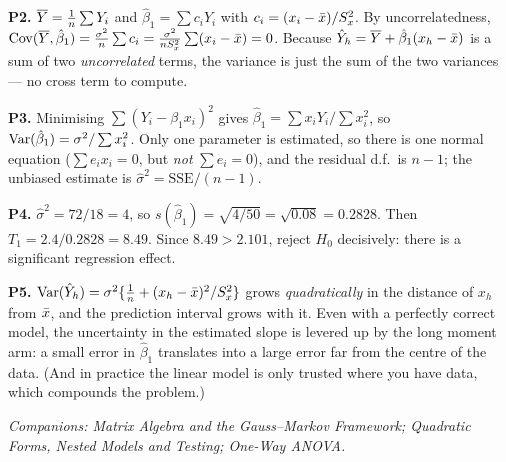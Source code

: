 \documentclass[11pt]{article}
\begin{document}
\smallskip\noindent\textbf{P2.} $\overline{Y}=\frac1n\sum Y_i$ and $\hat\beta_1=\sum c_iY_i$ with
$c_i=(x_i-\bar{x})/S_x^2$. By uncorrelatedness,
$\operatorname{Cov}(\overline{Y},\hat\beta_1)=\frac{\sigma^2}{n}\sum c_i = \frac{\sigma^2}{nS_x^2}\sum(x_i-\bar{x})=0$.
Because $\hat Y_h=\overline{Y}+\hat\beta_1(x_h-\bar{x})$ is a sum of two \emph{uncorrelated} terms,
the variance is just the sum of the two variances --- no cross term to compute.

\smallskip\noindent\textbf{P3.} Minimising $\sum(Y_i-\beta_1x_i)^2$ gives
$\hat\beta_1=\sum x_iY_i/\sum x_i^2$, so $\operatorname{Var}(\hat\beta_1)=\sigma^2/\sum x_i^2$. Only one
parameter is estimated, so there is one normal equation ($\sum e_ix_i=0$, but \emph{not}
$\sum e_i=0$), and the residual d.f.\ is $n-1$; the unbiased estimate is
$\hat\sigma^2=\mathrm{SSE}/(n-1)$.

\smallskip\noindent\textbf{P4.} $\hat\sigma^2=72/18=4$, so
$s(\hat\beta_1)=\sqrt{4/50}=\sqrt{0.08}=0.2828$. Then $T_1=2.4/0.2828=8.49$. Since
$8.49>2.101$, reject $H_0$ decisively: there is a significant regression effect.

\smallskip\noindent\textbf{P5.} $\operatorname{Var}(\hat Y_h)=\sigma^2\{\frac1n+(x_h-\bar{x})^2/S_x^2\}$
grows \emph{quadratically} in the distance of $x_h$ from $\bar{x}$, and the prediction
interval grows with it. Even with a perfectly correct model, the uncertainty in the
estimated slope is levered up by the long moment arm: a small error in $\hat\beta_1$
translates into a large error far from the centre of the data. (And in practice the linear
model is only trusted where you have data, which compounds the problem.)

\vfill
\begin{center}\small\itshape
Companions: Matrix Algebra and the Gauss--Markov Framework;
Quadratic Forms, Nested Models and Testing; One-Way ANOVA.
\end{center}
\end{document}
